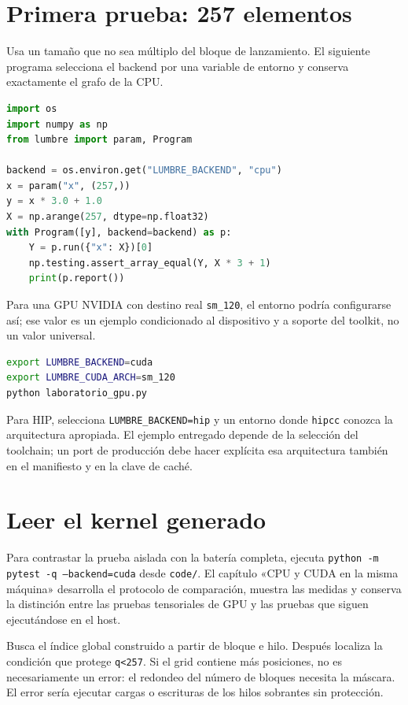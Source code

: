 \documentclass[12pt,a4paper,oneside]{report}
\begin{document}
\section{Primera prueba: 257 elementos}
Usa un tamaño que no sea múltiplo del bloque de lanzamiento. El siguiente programa selecciona el backend por una variable de entorno y conserva exactamente el grafo de la CPU.

\begin{lstlisting}[language=Python]
import os
import numpy as np
from lumbre import param, Program

backend = os.environ.get("LUMBRE_BACKEND", "cpu")
x = param("x", (257,))
y = x * 3.0 + 1.0
X = np.arange(257, dtype=np.float32)
with Program([y], backend=backend) as p:
    Y = p.run({"x": X})[0]
    np.testing.assert_array_equal(Y, X * 3 + 1)
    print(p.report())
\end{lstlisting}
Para una GPU NVIDIA con destino real \texttt{sm\_120}, el entorno podría configurarse así; ese valor es un ejemplo condicionado al dispositivo y a soporte del toolkit, no un valor universal.

\begin{lstlisting}[language=bash]
export LUMBRE_BACKEND=cuda
export LUMBRE_CUDA_ARCH=sm_120
python laboratorio_gpu.py
\end{lstlisting}
Para HIP, selecciona \texttt{LUMBRE\_BACKEND=hip} y un entorno donde \texttt{hipcc} conozca la arquitectura apropiada. El ejemplo entregado depende de la selección del toolchain; un port de producción debe hacer explícita esa arquitectura también en el manifiesto y en la clave de caché.

\section{Leer el kernel generado}
Para contrastar la prueba aislada con la batería completa, ejecuta \texttt{python -m py\allowbreak{}test -q --ba\allowbreak{}ckend=cuda} desde \texttt{code/}. El capítulo «CPU y CUDA en la misma máquina» desarrolla el protocolo de comparación, muestra las medidas y conserva la distinción entre las pruebas tensoriales de GPU y las pruebas que siguen ejecutándose en el host.

Busca el índice global construido a partir de bloque e hilo. Después localiza la condición que protege \texttt{q<257}. Si el grid contiene más posiciones, no es necesariamente un error: el redondeo del número de bloques necesita la máscara. El error sería ejecutar cargas o escrituras de los hilos sobrantes sin protección.
\end{document}
